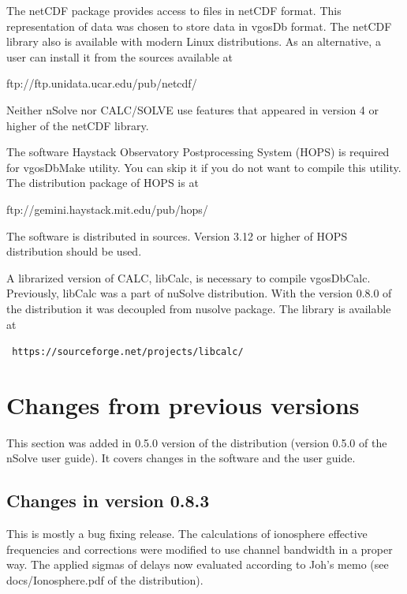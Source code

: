 \documentclass [10pt,letterpaper]{report}
\newcommand{\nuSolve}{\greektext n\latintext Solve}
\begin{document}
The netCDF package provides access
to files in netCDF format. This representation of data was chosen to store
data in vgosDb format. The netCDF library also is available with modern
Linux distributions. As an alternative, a user can install it from the
sources available at
\begin{center}
ftp://ftp.unidata.ucar.edu/pub/netcdf/
\end{center}
\noindent
Neither \nuSolve{} nor CALC/SOLVE use features that appeared in version 4
or higher of the netCDF library.

The software Haystack Observatory Postprocessing System (HOPS) is required
for vgosDbMake utility. You can skip it if you do not want to compile this
utility. The distribution package of HOPS is at
\begin{center}
ftp://gemini.haystack.mit.edu/pub/hops/
\end{center}
\noindent
The software is distributed in sources. Version 3.12 or higher of HOPS
distribution should be used.

A librarized version of CALC, libCalc, is necessary to compile vgosDbCalc.
Previously, libCalc was a part of nuSolve distribution. With the version
0.8.0 of the distribution it was decoupled from nusolve package.
The library is available at
\begin{center}
{\tt
https://sourceforge.net/projects/libcalc/
}
\end{center}



\section{Changes from previous versions}
\label{intro_changes}

This section was added in 0.5.0 version of the distribution (version 0.5.0
of the \nuSolve{} user guide). It covers changes in the software and the user
guide.


\subsection{Changes in version 0.8.3}

This is mostly a bug fixing release. The calculations of ionosphere effective
frequencies and corrections were modified to use channel bandwidth in a proper
way. The applied sigmas of delays now evaluated according to Joh's memo 
(see docs/Ionosphere.pdf of the distribution).
\end{document}
